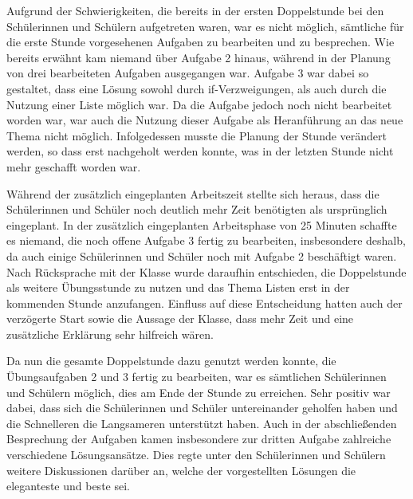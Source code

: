 Aufgrund der Schwierigkeiten, die bereits in der ersten Doppelstunde bei den Schülerinnen und Schülern aufgetreten waren, war es nicht möglich, sämtliche für die erste Stunde vorgesehenen Aufgaben zu bearbeiten und zu besprechen.
Wie bereits erwähnt kam niemand über Aufgabe 2 hinaus, während in der Planung von drei bearbeiteten Aufgaben ausgegangen war.
Aufgabe 3 war dabei so gestaltet, dass eine Lösung sowohl durch if-Verzweigungen, als auch durch die Nutzung einer Liste möglich war.
Da die Aufgabe jedoch noch nicht bearbeitet worden war, war auch die Nutzung dieser Aufgabe als Heranführung an das neue Thema nicht möglich.
Infolgedessen musste die Planung der Stunde verändert werden, so dass erst nachgeholt werden konnte, was in der letzten Stunde nicht mehr geschafft worden war.

Während der zusätzlich eingeplanten Arbeitszeit stellte sich heraus, dass die Schülerinnen und Schüler noch deutlich mehr Zeit benötigten als ursprünglich eingeplant.
In der zusätzlich eingeplanten Arbeitsphase von 25 Minuten schaffte es niemand, die noch offene Aufgabe 3 fertig zu bearbeiten, insbesondere deshalb, da auch einige Schülerinnen und Schüler noch mit Aufgabe 2 beschäftigt waren.
Nach Rücksprache mit der Klasse wurde daraufhin entschieden, die Doppelstunde als weitere Übungsstunde zu nutzen und das Thema Listen erst in der kommenden Stunde anzufangen.
Einfluss auf diese Entscheidung hatten auch der verzögerte Start sowie die Aussage der Klasse, dass mehr Zeit und eine zusätzliche Erklärung sehr hilfreich wären.

Da nun die gesamte Doppelstunde dazu genutzt werden konnte, die Übungsaufgaben 2 und 3 fertig zu bearbeiten, war es sämtlichen Schülerinnen und Schülern möglich, dies am Ende der Stunde zu erreichen.
Sehr positiv war dabei, dass sich die Schülerinnen und Schüler untereinander geholfen haben und die Schnelleren die Langsameren unterstützt haben.
Auch in der abschließenden Besprechung der Aufgaben kamen insbesondere zur dritten Aufgabe zahlreiche verschiedene Lösungsansätze.
Dies regte unter den Schülerinnen und Schülern weitere Diskussionen darüber an, welche der vorgestellten Lösungen die eleganteste und beste sei.

